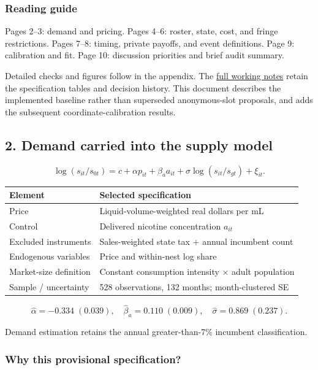 \documentclass[11pt,]{article}
\begin{document}
\subsubsection{Reading guide}\label{reading-guide}

Pages 2--3: demand and pricing. Pages 4--6: roster, state, cost, and
fringe restrictions. Pages 7--8: timing, private payoffs, and event
definitions. Page 9: calibration and fit. Page 10: discussion priorities
and brief audit summary.

Detailed checks and figures follow in the appendix. The
\href{marc_mtg_2026-11-10.pdf}{full working notes} retain the
specification tables and decision history. This document describes the
implemented baseline rather than superseded anonymous-slot proposals,
and adds the subsequent coordinate-calibration results.

\clearpage

\subsection{2. Demand carried into the supply
model}\label{demand-carried-into-the-supply-model}

\[
\log(s_{it}/s_{0t})=c+\alpha p_{it}+\beta_a a_{it}
+\sigma\log(s_{it}/s_{gt})+\xi_{it}.
\]

\begin{longtable}[]{@{}ll@{}}
\toprule
Element & Selected specification\tabularnewline
\midrule
\endhead
Price & Liquid-volume-weighted real dollars per mL\tabularnewline
Control & Delivered nicotine concentration \(a_{it}\)\tabularnewline
Excluded instruments & Sales-weighted state tax + annual incumbent
count\tabularnewline
Endogenous variables & Price and within-nest log share\tabularnewline
Market-size definition & Constant consumption intensity × adult
population\tabularnewline
Sample / uncertainty & 528 observations, 132 months; month-clustered
SE\tabularnewline
\bottomrule
\end{longtable}

\[
\widehat\alpha=-0.334\;(0.039),\quad
\widehat\beta_a=0.110\;(0.009),\quad
\widehat\sigma=0.869\;(0.237).
\]

Demand estimation retains the annual greater-than-7\% incumbent
classification.

\subsubsection{Why this provisional
specification?}\label{why-this-provisional-specification}
\end{document}

